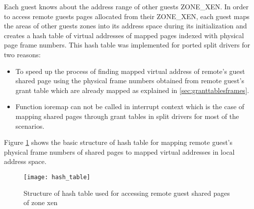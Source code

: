 Each guest knows about the address range of other guests ZONE\_XEN. In order to access remote guests pages allocated from their ZONE\_XEN, each guest maps the areas of other guests zones into its address space during its initialization and creates a hash table of virtual addresses of mapped pages indexed with physical page frame numbers. This hash table was implemented for ported split drivers for two reasons:

\begin{itemize}
	\item To speed up the process of finding mapped virtual address of remote's guest shared page using the physical frame numbers obtained from remote guest's grant table which are already mapped as explained in \ref{sec:granttablesframes}.
	\item Function ioremap can not be called in interrupt context which is the case of mapping shared pages through grant tables in split drivers for most of the scenarios.
\end{itemize}

Figure \ref{hash_table} shows the basic structure of hash table for mapping remote guest's physical frame numbers of shared pages to mapped virtual addresses in local address space.

\begin{figure}[!htbp]
	\centering
	\texttt{[image: hash\_table]}
	\caption{Structure of hash table used for accessing remote guest shared pages of zone xen}
	\label{hash_table}
\end{figure}


